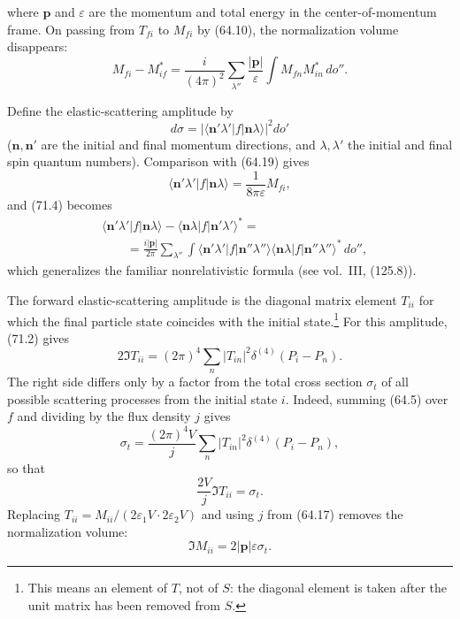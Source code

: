 where $\mathbf p$ and $\varepsilon$ are the momentum and total energy in the center-of-momentum frame. On passing from $T_{fi}$ to $M_{fi}$ by (64.10), the normalization volume disappears:
\begin{equation}
M_{fi}-M_{if}^*=\frac{i}{(4\pi)^2}\sum_{\lambda''}\frac{\lvert\mathbf p\rvert}{\varepsilon}
\int M_{fn}M_{in}^*\,do''.
\tag{71.4}
\end{equation}

Define the elastic-scattering amplitude by
\begin{equation}
d\sigma=\lvert\langle\mathbf n'\lambda'\vert f\vert\mathbf n\lambda\rangle\rvert^2do'
\tag{71.5}
\end{equation}
($\mathbf n,\mathbf n'$ are the initial and final momentum directions, and $\lambda,\lambda'$ the initial and final spin quantum numbers). Comparison with (64.19) gives
\begin{equation}
\langle\mathbf n'\lambda'\vert f\vert\mathbf n\lambda\rangle=\frac{1}{8\pi\varepsilon}M_{fi},
\tag{71.6}
\end{equation}
and (71.4) becomes
\begin{equation}
\begin{aligned}
&\langle\mathbf n'\lambda'\vert f\vert\mathbf n\lambda\rangle
-\langle\mathbf n\lambda\vert f\vert\mathbf n'\lambda'\rangle^*={}\\
&\qquad=\frac{i\lvert\mathbf p\rvert}{2\pi}\sum_{\lambda''}\int
\langle\mathbf n'\lambda'\vert f\vert\mathbf n''\lambda''\rangle
\langle\mathbf n\lambda\vert f\vert\mathbf n''\lambda''\rangle^*\,do'',
\end{aligned}
\tag{71.7}
\end{equation}
which generalizes the familiar nonrelativistic formula (see vol.~III, (125.8)).

The forward elastic-scattering amplitude is the diagonal matrix element $T_{ii}$ for which the final particle state coincides with the initial state.\footnote{This means an element of $T$, not of $S$: the diagonal element is taken after the unit matrix has been removed from $S$.} For this amplitude, (71.2) gives
\begin{equation}
2\Im T_{ii}=(2\pi)^4\sum_n\lvert T_{in}\rvert^2\delta^{(4)}(P_i-P_n).
\tag{71.8}
\end{equation}
The right side differs only by a factor from the total cross section $\sigma_t$ of all possible scattering processes from the initial state $i$. Indeed, summing (64.5) over $f$ and dividing by the flux density $j$ gives
\[
\sigma_t=\frac{(2\pi)^4V}{j}\sum_n\lvert T_{in}\rvert^2\delta^{(4)}(P_i-P_n),
\]
so that
\[
\frac{2V}{j}\Im T_{ii}=\sigma_t.
\]
Replacing $T_{ii}=M_{ii}/(2\varepsilon_1V\cdot2\varepsilon_2V)$ and using $j$ from (64.17) removes the normalization volume:
\begin{equation}
\Im M_{ii}=2\lvert\mathbf p\rvert\varepsilon\sigma_t.
\tag{71.9}
\end{equation}

